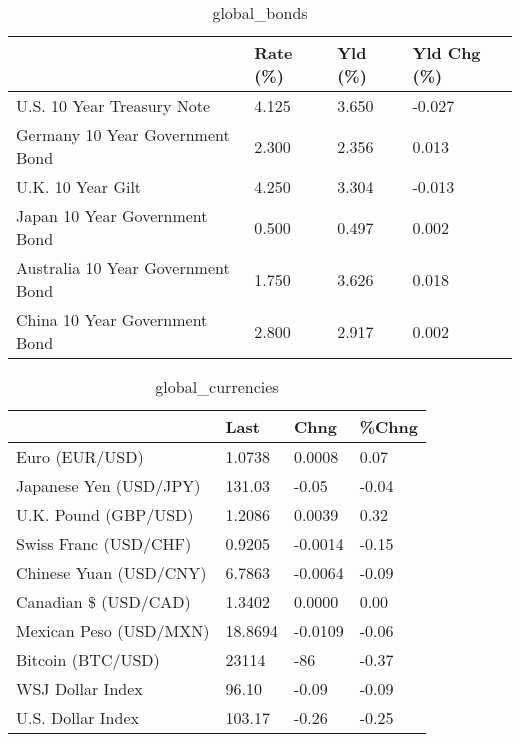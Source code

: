 \documentclass{article}%
\begin{document}
%


\begin{table}[htbp]%
\caption{global\_bonds}%
\centering%
\begin{adjustbox}{width=1\textwidth}%
\begin{tabular}{llll}
\toprule
                                  & Rate (\%) & Yld (\%) & Yld Chg (\%) \\
\midrule
       U.S. 10 Year Treasury Note &    4.125 &   3.650 &      -0.027 \\
  Germany 10 Year Government Bond &    2.300 &   2.356 &       0.013 \\
                U.K. 10 Year Gilt &    4.250 &   3.304 &      -0.013 \\
    Japan 10 Year Government Bond &    0.500 &   0.497 &       0.002 \\
Australia 10 Year Government Bond &    1.750 &   3.626 &       0.018 \\
    China 10 Year Government Bond &    2.800 &   2.917 &       0.002 \\
\bottomrule
\end{tabular}
%
\end{adjustbox}%
\end{table}

%


\begin{table}[htbp]%
\caption{global\_currencies}%
\centering%
\begin{adjustbox}{width=1\textwidth}%
\begin{tabular}{llll}
\toprule
                       &    Last &    Chng & \%Chng \\
\midrule
        Euro (EUR/USD) &  1.0738 &  0.0008 &  0.07 \\
Japanese Yen (USD/JPY) &  131.03 &   -0.05 & -0.04 \\
  U.K. Pound (GBP/USD) &  1.2086 &  0.0039 &  0.32 \\
 Swiss Franc (USD/CHF) &  0.9205 & -0.0014 & -0.15 \\
Chinese Yuan (USD/CNY) &  6.7863 & -0.0064 & -0.09 \\
  Canadian \$ (USD/CAD) &  1.3402 &  0.0000 &  0.00 \\
Mexican Peso (USD/MXN) & 18.8694 & -0.0109 & -0.06 \\
     Bitcoin (BTC/USD) &   23114 &     -86 & -0.37 \\
      WSJ Dollar Index &   96.10 &   -0.09 & -0.09 \\
     U.S. Dollar Index &  103.17 &   -0.26 & -0.25 \\
\bottomrule
\end{tabular}
%
\end{adjustbox}%
\end{table}
\end{document}
